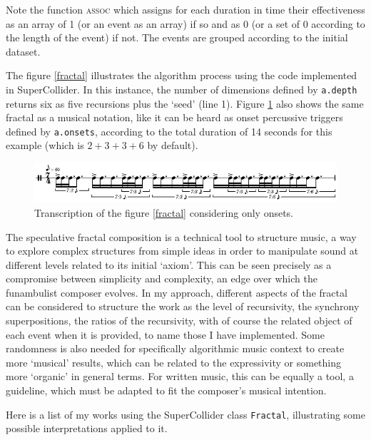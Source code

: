 \documentclass{article}
\begin{document}
Note the function \textsc{assoc} which assigns for each duration in time their effectiveness as an array of 1 (or an event as an array) if so and as 0 (or a set of 0 according to the length of the event) if not. The events are grouped according to the initial dataset.

The figure \ref{fractal} illustrates the algorithm process using the code implemented in SuperCollider. In this instance, the number of dimensions defined by \texttt{a.depth} returns six as five recursions plus the `seed' (line 1). Figure \ref{score}   also shows the same fractal as a musical notation, like it can be heard as onset percussive triggers defined by \texttt{a.onsets}, according to the total duration of 14 seconds for this example (which is $2+3+3+6$ by default).

\begin{figure}[htbp]
\includegraphics[width=\textwidth]{score}
\caption{Transcription of the figure \ref{fractal} considering only onsets.}
\label{score}
\end{figure}

The speculative fractal composition is a technical tool to structure music, a way to explore complex structures from simple ideas in order to manipulate sound at different levels related to its initial `axiom'. This can be seen precisely as a compromise between simplicity and complexity, an edge over which the funambulist composer evolves.
In my approach, different aspects of the fractal can be considered to structure the work as the level of recursivity, the synchrony superpositions, the ratios of the recursivity, with of course the related object of each event when it is provided, to name those I have implemented. Some randomness is also needed for specifically algorithmic music context to create more `musical' results, which can be related to the expressivity or something more `organic' in general terms. For written music, this can be equally a tool, a guideline, which must be adapted to fit the composer's musical intention.
 
\bigskip
Here is a list of my works using the SuperCollider class \texttt{Fractal}, illustrating some possible interpretations applied to it. 

\vspace{-2mm}
\end{document}
